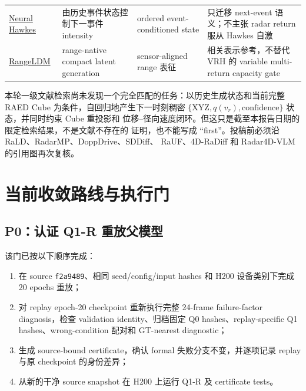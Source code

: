 \documentclass[11pt,a4paper,fontset=none]{ctexart}
\newcommand{\code}[1]{\texttt{#1}}
\newcommand{\xyz}{\mathrm{XYZ}}
\begin{document}
\begin{longtable}{p{2.7cm} p{4.1cm} p{4.4cm} p{3.5cm}}
\href{https://papers.neurips.cc/paper_files/paper/2017/hash/6463c88460bd63bbe256e495c63aa40b-Abstract.html}{Neural Hawkes} &
由历史事件状态控制下一事件 intensity &
ordered event-conditioned state &
只迁移 next-event 语义；不主张 radar return 服从 Hawkes 自激 \\

\href{https://arxiv.org/abs/2403.10094}{RangeLDM} &
range-native compact latent generation &
sensor-aligned range 表征 &
相关表示参考，不替代 VRH 的 variable multi-return capacity gate \\
\bottomrule
\end{longtable}

本轮一级文献检索尚未发现一个完全匹配的任务：以历史生成状态和当前完整
RAED Cube 为条件，自回归地产生下一时刻稠密
$\{\xyz,q(v_r),\text{confidence}\}$ 状态，并同时约束 Cube 重投影和
位移--径向速度闭环。但这只是截至本报告日期的限定检索结果，不是文献不存在的
证明，也不能写成 ``first''。投稿前必须沿 RaLD、RadarMP、DoppDrive、SDDiff、
RaUF、4D-RaDiff 和 Radar4D-VLM 的引用图再次复核。

\section{当前收敛路线与执行门}

\subsection{P0：认证 Q1-R 重放父模型}

该门已按以下顺序完成：
\begin{enumerate}
  \item 在 source \code{f2a9489}、相同 seed/config/input hashes 和 H200
  设备类别下完成 20 epochs 重放；
  \item 对 replay epoch-20 checkpoint 重新执行完整 24-frame failure-factor
  diagnosis，检查 validation identity、归档固定 Q0 hashes、replay-specific Q1
  hashes、wrong-condition 配对和 GT-nearest diagnostic；
  \item 生成 source-bound certificate，确认 formal 失败分支不变，并逐项记录
  replay 与原 checkpoint 的身份差异；
  \item 从新的干净 source snapshot 在 H200 上运行 Q1-R 及 certificate tests。
\end{enumerate}
\end{document}

